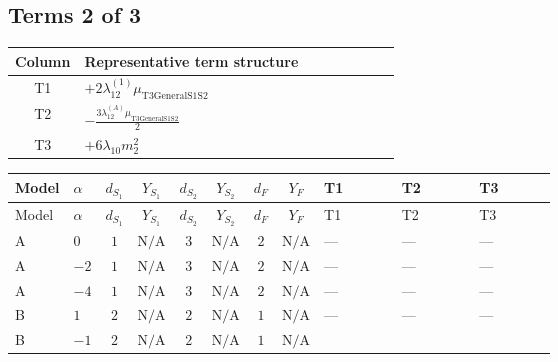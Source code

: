 \documentclass[8pt]{article}
\begin{document}
\begin{landscape}
\subsection*{Terms 2 of 3}
\begin{center}
\begin{tabular}{@{}c >{\raggedright\arraybackslash}p{0.82\linewidth}@{}}
\toprule
Column & Representative term structure \\
\midrule
T1 & \(\displaystyle +2 {\lambda_{12}^{(1)}} {\mu_{\mathrm{T3GeneralS1S2}}}\) \\
\midrule
T2 & \(\displaystyle -\frac{3 {\lambda_{12}^{(A)}} {\mu_{\mathrm{T3GeneralS1S2}}}}{2}\) \\
\midrule
T3 & \(\displaystyle +6 {\lambda_{10}} {m_2^2}\) \\
\midrule
\bottomrule
\end{tabular}
\end{center}
\smallskip
\tiny
\begin{longtable}{@{}llcccccc >{\raggedright\arraybackslash}p{0.21\linewidth} >{\raggedright\arraybackslash}p{0.21\linewidth} >{\raggedright\arraybackslash}p{0.21\linewidth}@{}}
\toprule
Model & $\alpha$ & $d_{S_1}$ & $Y_{S_1}$ & $d_{S_2}$ & $Y_{S_2}$ & $d_F$ & $Y_F$ & T1 & T2 & T3 \\
\midrule
\endfirsthead
\toprule
Model & $\alpha$ & $d_{S_1}$ & $Y_{S_1}$ & $d_{S_2}$ & $Y_{S_2}$ & $d_F$ & $Y_F$ & T1 & T2 & T3 \\
\midrule
\endhead
A & $0$ & $1$ & $\text{N/A}$ & $3$ & $\text{N/A}$ & $2$ & $\text{N/A}$ & --- & --- & --- \\
\midrule
A & $-2$ & $1$ & $\text{N/A}$ & $3$ & $\text{N/A}$ & $2$ & $\text{N/A}$ & --- & --- & --- \\
\midrule
A & $-4$ & $1$ & $\text{N/A}$ & $3$ & $\text{N/A}$ & $2$ & $\text{N/A}$ & --- & --- & --- \\
\midrule
B & $1$ & $2$ & $\text{N/A}$ & $2$ & $\text{N/A}$ & $1$ & $\text{N/A}$ & --- & --- & --- \\
\midrule
B & $-1$ & $2$ & $\text{N/A}$ & $2$ & $\text{N/A}$ & $1$ & $\text{N/A}$ & \scriptsize\adjustbox{max width=\linewidth}{$\begin{gathered} +2 {\lambda_{12}^{(1)}} {\mu_{\mathrm{T3GeneralS1S2}}}\end{gathered}$} & \scriptsize\adjustbox{max width=\linewidth}{$\begin{gathered} -\frac{3 {\lambda_{12}^{(A)}} {\mu_{\mathrm{T3GeneralS1S2}}}}{2}\end{gathered}$} & \scriptsize\adjustbox{max width=\linewidth}{$\begin{gathered} +6 {\lambda_{10}} {m_2^2}\end{gathered}$} \\

\end{longtable}
\end{landscape}
\end{document}
